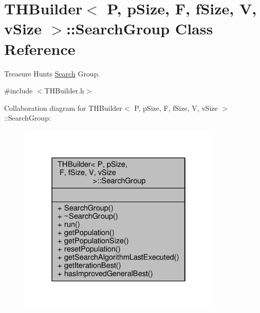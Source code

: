 \hypertarget{classTHBuilder_1_1SearchGroup}{}\section{T\+H\+Builder$<$ P, p\+Size, F, f\+Size, V, v\+Size $>$\+:\+:Search\+Group Class Reference}
\label{classTHBuilder_1_1SearchGroup}


Treasure Hunt\textquotesingle{}s \hyperlink{classSearch}{Search} Group.  




{\ttfamily \#include $<$T\+H\+Builder.\+h$>$}



Collaboration diagram for T\+H\+Builder$<$ P, p\+Size, F, f\+Size, V, v\+Size $>$\+:\+:Search\+Group\+:
\nopagebreak
\begin{figure}[H]
\begin{center}
\leavevmode
\includegraphics[width=274pt]{classTHBuilder_1_1SearchGroup__coll__graph}
\end{center}
\end{figure}
